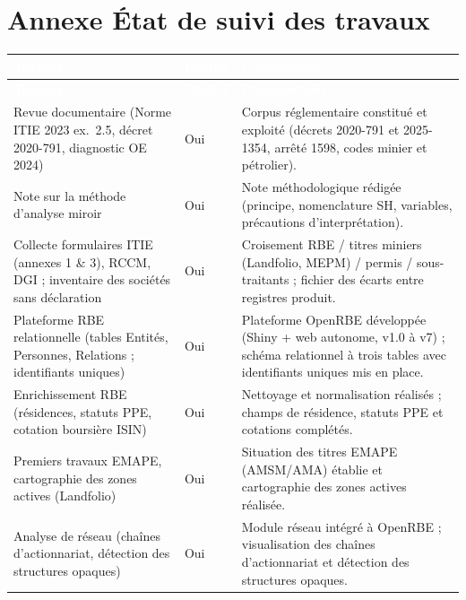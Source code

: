 \documentclass[12pt, a4paper]{article}
\newcommand{\entete}{\rowcolor{ensaeorange}}
\newcommand{\zebre}{\rowcolors{2}{white}{ensaerow}}
\begin{document}
\clearpage
{}
{}
\section*{Annexe État de suivi des travaux}
\label{annexe:suivi}

\begin{small}
\begin{singlespace}
\zebre
\begin{longtable}{p{5.2cm}p{2.1cm}p{6.6cm}}
  \entete
  \textcolor{white}{\textbf{Travaux}} &
  \textcolor{white}{\textbf{Réalisé}} &
  \textcolor{white}{\textbf{Commentaire}}\\
  \endfirsthead
  \entete
  \textcolor{white}{\textbf{Travaux}} &
  \textcolor{white}{\textbf{Réalisé}} &
  \textcolor{white}{\textbf{Commentaire}}\\
  \endhead
  Revue documentaire (Norme ITIE 2023 ex.~2.5, décret 2020-791, diagnostic OE 2024) & Oui & Corpus réglementaire constitué et exploité (décrets 2020-791 et 2025-1354, arrêté 1598, codes minier et pétrolier).\\
  Note sur la méthode d'analyse miroir & Oui & Note méthodologique rédigée (principe, nomenclature SH, variables, précautions d'interprétation).\\
  Collecte formulaires ITIE (annexes 1 \& 3), RCCM, DGI ; inventaire des sociétés sans déclaration & Oui & Croisement RBE / titres miniers (Landfolio, MEPM) / permis / sous-traitants ; fichier des écarts entre registres produit.\\
  Plateforme RBE relationnelle (tables Entités, Personnes, Relations ; identifiants uniques) & Oui & Plateforme OpenRBE développée (Shiny + web autonome, v1.0 à v7) ; schéma relationnel à trois tables avec identifiants uniques mis en place.\\
  Enrichissement RBE (résidences, statuts PPE, cotation boursière ISIN) & Oui & Nettoyage et normalisation réalisés ; champs de résidence, statuts PPE et cotations complétés.\\
  Premiers travaux EMAPE, cartographie des zones actives (Landfolio) & Oui & Situation des titres EMAPE (AMSM/AMA) établie et cartographie des zones actives réalisée.\\
  Analyse de réseau (chaînes d'actionnariat, détection des structures opaques) & Oui & Module réseau intégré à OpenRBE ; visualisation des chaînes d'actionnariat et détection des structures opaques.\\

\end{longtable}
\end{singlespace}
\end{small}
\end{document}
